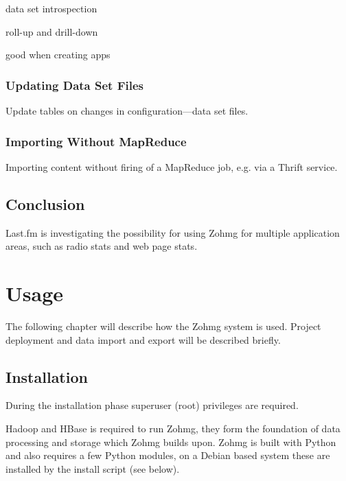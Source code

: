 data set introspection

roll-up and drill-down

good when creating apps


\subsection*{Updating Data Set Files}

Update tables on changes in configuration---data set files.


\subsection*{Importing Without MapReduce}

Importing content without firing of a MapReduce job, e.g. via a Thrift
service.



\section{Conclusion}

Last.fm is investigating the possibility for using Zohmg for multiple
application areas, such as radio stats and web page stats.


\pagebreak



 



\appendix



\chapter{Usage}


\noindent The following chapter will describe how the Zohmg system is used.
Project deployment and data import and export will be described briefly.


\section*{Installation}

During the installation phase superuser (root) privileges are required.

Hadoop and HBase is required to run Zohmg, they form the foundation of data
processing and storage which Zohmg builds upon. Zohmg is built with Python and
also requires a few Python modules, on a Debian based system these are installed
by the install script (see below).

